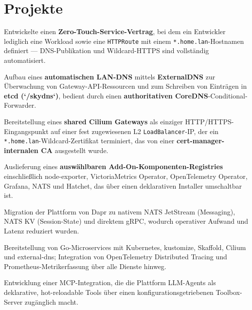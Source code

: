 \documentclass[10pt,a4paper]{resume}
\begin{document}
\vspace{2pt}

\section{Projekte}

\bullets
  \item Entwickelte einen \textbf{Zero-Touch-Service-Vertrag}, bei dem ein Entwickler lediglich eine Workload sowie eine \texttt{HTTPRoute} mit einem \texttt{*.home.lan}-Hostnamen definiert — DNS-Publikation und Wildcard-HTTPS sind vollständig automatisiert.
  \item Aufbau eines \textbf{automatischen LAN-DNS} mittels \textbf{ExternalDNS} zur Überwachung von Gateway-API-Ressourcen und zum Schreiben von Einträgen in \textbf{etcd (`/skydns`)}, bedient durch einen \textbf{authoritativen CoreDNS}-Conditional-Forwarder.
  \item Bereitstellung eines \textbf{shared Cilium Gateways} als einziger HTTP/HTTPS-Eingangspunkt auf einer fest zugewiesenen L2 \texttt{LoadBalancer}-IP, der ein \texttt{*.home.lan}-Wildcard-Zertifikat terminiert, das von einer \textbf{cert-manager-internalen CA} ausgestellt wurde.
  \item Auslieferung eines \textbf{auswählbaren Add-On-Komponenten-Registries} einschließlich node-exporter, VictoriaMetrics Operator, OpenTelemetry Operator, Grafana, NATS und Hatchet, das über einen deklarativen Installer umschaltbar ist.
\bulletsend
\vspace{1.0pt}
\bullets
  \item Migration der Plattform von Dapr zu nativem NATS JetStream (Messaging), NATS KV (Session-State) und direktem gRPC, wodurch operativer Aufwand und Latenz reduziert wurden.
  \item Bereitstellung von Go-Microservices mit Kubernetes, kustomize, Skaffold, Cilium und external-dns; Integration von OpenTelemetry Distributed Tracing und Prometheus-Metrikerfassung über alle Dienste hinweg.
  \item Entwicklung einer MCP-Integration, die die Plattform LLM-Agents als deklarative, hot-reloadable Tools über einen konfigurationsgetriebenen Toolbox-Server zugänglich macht.
\bulletsend
\end{document}
